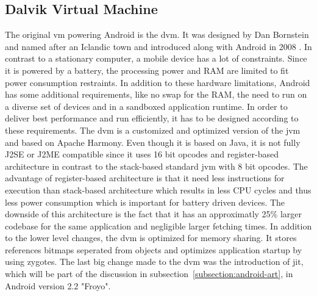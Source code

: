 \subsection{Dalvik Virtual Machine} \label{subsection:android-dalvik}
The original \gls{vm} powering Android is the \gls{dvm}.
It was designed by Dan Bornstein and named after an Iclandic town and introduced along with Android in 2008 \cite{developersRelease}.
\newline
In contrast to a stationary computer, a mobile device has a lot of constraints.
Since it is powered by a battery, the processing power and RAM are limited to fit power consumption restraints.
In addition to these hardware limitations, Android has some additional requirements, like no swap for the RAM, the need to run on a diverse set of devices and in a sandboxed application runtime.
In order to deliver best performance and run efficiently, it has to be designed according to these requirements.
\newline
The \gls{dvm} is a customized and optimized version of the \gls{jvm} and based on Apache Harmony.
Even though it is based on Java, it is not fully J2SE or J2ME compatible since it uses 16 bit opcodes and register-based architecture in contrast to the stack-based standard \gls{jvm} with 8 bit opcodes.
The advantage of register-based architecture is that it need less instructions for execution than stack-based architecture which results in less CPU cycles and thus less power consumption which is important for battery driven devices.
The downside of this architecture is the fact that it has an approximatly 25\% larger codebase for the same application and negligible larger fetching times.
In addition to the lower level changes, the \gls{dvm} is optimized for memory sharing.
It stores references bitmaps seperated from objects and optimizes application startup by using zygotes. \cite{ehringerDalvik} \cite{andevconDalvikART}
\newline
The last big change made to the \gls{dvm} was the introduction of \gls{jit}, which will be part of the discussion in subsection~\ref{subsection:android-art}, in Android version 2.2 "Froyo".
